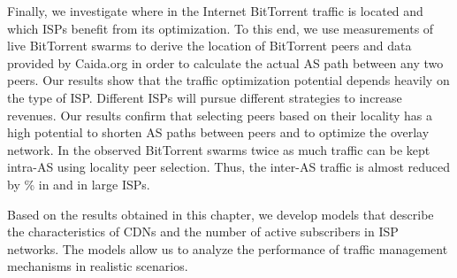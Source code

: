 Finally, we investigate where in the Internet BitTorrent traffic is located and which ISPs benefit from its optimization. To this end, we use measurements of live BitTorrent swarms to derive the location of BitTorrent peers and data provided by Caida.org in order to calculate the actual AS path between any two peers.
Our results show that the traffic optimization potential depends heavily on the type of ISP. Different ISPs will pursue different strategies to increase revenues.
Our results confirm that selecting peers based on their locality has a high potential to shorten AS paths between peers and to optimize the overlay network. In the observed BitTorrent swarms twice as much traffic can be kept intra-AS using locality peer selection. Thus, the inter-AS traffic is almost reduced by \unit[50]{\%} in \tier and in large ISPs.

Based on the results obtained in this chapter, we develop models that describe the characteristics of CDNs and the number of active subscribers in ISP networks.
The models allow us to analyze the performance of traffic management mechanisms in realistic scenarios.

